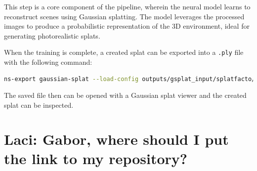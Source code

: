 This step is a core component of the pipeline, wherein the neural model learns to reconstruct scenes using Gaussian splatting. The model leverages the processed images to produce a probabilistic representation of the 3D environment, ideal for generating photorealistic splats.

When the training is complete, a created splat can be exported into a \verb|.ply| file with the following command:
\FloatBarrier
\begin{lstlisting}[language=bash,frame=single,float=!ht]
ns-export gaussian-splat --load-config outputs/gsplat_input/splatfacto/DATE/config.yml --output-dir exports/splat/\end{lstlisting}
\FloatBarrier
The saved file then can be opened with a Gaussian splat viewer and the created splat can be inspected.

\section{Laci: Gabor, where should I put the link to my repository?}
